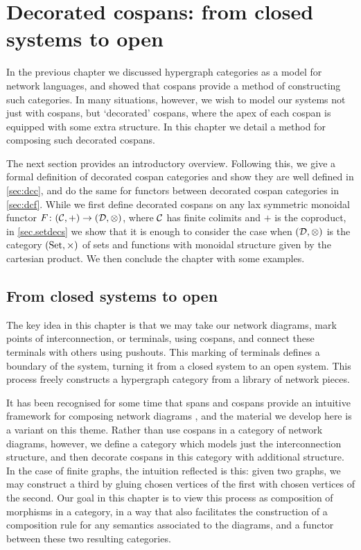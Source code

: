 \chapter{Decorated cospans: from closed systems to open} \label{ch.deccospans}

In the previous chapter we discussed hypergraph categories as a model for
network languages, and showed that cospans provide a method of constructing such
categories. In many situations, however, we wish to model our systems not just
with cospans, but `decorated' cospans, where the apex of each cospan is equipped
with some extra structure. In this chapter we detail a method for composing such
decorated cospans. 

The next section provides an introductory overview. Following this, we give a
formal definition of decorated cospan categories and show they are well defined
in \textsection\ref{sec:dcc}, and do the same for functors between decorated
cospan categories in \textsection\ref{sec:dcf}. While we first define decorated
cospans on any lax symmetric monoidal functor $F{\colon} (\mathcal C,+) \to
(\mathcal D,\otimes)$, where $\mathcal C$ has finite colimits and $+$ is the
coproduct, in \textsection\ref{sec.setdecs} we show that it is enough to
consider the case when $(\mathcal D, \otimes)$ is the category $(\mathrm{Set},\times)$ of
sets and functions with monoidal structure given by the cartesian product. We
then conclude the chapter with some examples.

\section{From closed systems to open} \label{sec.closedtoopen}

The key idea in this chapter is that we may take our network diagrams, mark
points of interconnection, or terminals, using cospans, and connect these
terminals with others using pushouts. This marking of terminals defines a
boundary of the system, turning it from a closed system to an open system.
This process freely constructs a hypergraph category from a library of network
pieces.

It has been recognised for some time that spans and cospans provide an intuitive
framework for composing network diagrams \cite{KSW}, and the material we develop
here is a variant on this theme. Rather than use cospans in a category of
network diagrams, however, we define a category which models just the
interconnection structure, and then decorate cospans in this category with
additional structure. In the case of finite graphs, the intuition reflected is
this: given two graphs, we may construct a third by gluing chosen vertices of
the first with chosen vertices of the second. Our goal in this chapter is to
view this process as composition of morphisms in a category, in a way that also
facilitates the construction of a composition rule for any semantics associated
to the diagrams, and a functor between these two resulting categories.

